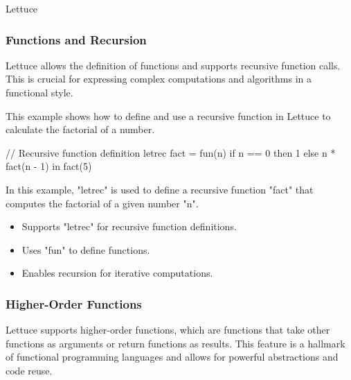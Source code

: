 \begin{notes}{Lettuce}
\begin{highlight}
    \end{highlight}
    
    \subsubsection*{Functions and Recursion}
    
    Lettuce allows the definition of functions and supports recursive function calls. This is crucial for expressing complex computations and algorithms in a functional style.
    
    \begin{highlight}
    
        This example shows how to define and use a recursive function in Lettuce to calculate the factorial of a number.
    
    \begin{code}[Lettuce]
    // Recursive function definition
    letrec fact = fun(n) {
        if n == 0 then 1 else n * fact(n - 1)
    } in
    fact(5)
    \end{code}
    
        In this example, "letrec" is used to define a recursive function "fact" that computes the factorial of a given number "n".
    
        \begin{itemize}
            \item Supports "letrec" for recursive function definitions.
            \item Uses "fun" to define functions.
            \item Enables recursion for iterative computations.
        \end{itemize}
    
    \end{highlight}
    
    \subsubsection*{Higher-Order Functions}
    
    Lettuce supports higher-order functions, which are functions that take other functions as arguments or return functions as results. This feature is a hallmark of functional programming languages and allows for powerful abstractions and code reuse.
    
    \begin{highlight}
    

\end{highlight}
\end{notes}
